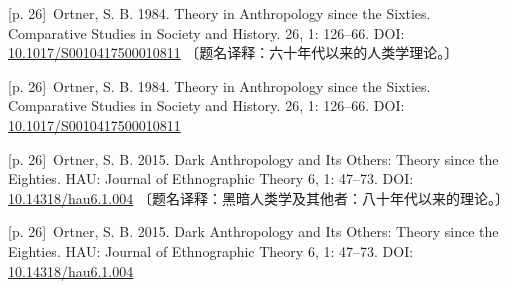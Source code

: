 \documentclass[10pt,a4paper]{article}
\begin{document}
\noindent\begin{minipage}{\textwidth}\begin{minipage}[t]{\dimexpr.5\textwidth-4mm\relax}\noindent\begin{minipage}[t]{\linewidth}{\scriptsize\color{gray} [p. 26]}\ Ortner, S. B. 1984. Theory in Anthropology since the Sixties. Comparative Studies in Society and History. 26, 1: 126–66. DOI: \url{10.1017/S0010417500010811} 〔题名译释：六十年代以来的人类学理论。〕\par\end{minipage}\par\end{minipage}\hfill\begin{minipage}[t]{\dimexpr.5\textwidth-4mm\relax}\noindent\begin{minipage}[t]{\linewidth}{\scriptsize\color{gray} [p. 26]}\ Ortner, S. B. 1984. Theory in Anthropology since the Sixties. Comparative Studies in Society and History. 26, 1: 126–66. DOI: \url{10.1017/S0010417500010811}\par\end{minipage}\par\end{minipage}\end{minipage}\par
\noindent\begin{minipage}{\textwidth}\begin{minipage}[t]{\dimexpr.5\textwidth-4mm\relax}\noindent\begin{minipage}[t]{\linewidth}{\scriptsize\color{gray} [p. 26]}\ Ortner, S. B. 2015. Dark Anthropology and Its Others: Theory since the Eighties. HAU: Journal of Ethnographic Theory 6, 1: 47–73. DOI: \url{10.14318/hau6.1.004} 〔题名译释：黑暗人类学及其他者：八十年代以来的理论。〕\par\end{minipage}\par\end{minipage}\hfill\begin{minipage}[t]{\dimexpr.5\textwidth-4mm\relax}\noindent\begin{minipage}[t]{\linewidth}{\scriptsize\color{gray} [p. 26]}\ Ortner, S. B. 2015. Dark Anthropology and Its Others: Theory since the Eighties. HAU: Journal of Ethnographic Theory 6, 1: 47–73. DOI: \url{10.14318/hau6.1.004}\par\end{minipage}\par\end{minipage}\end{minipage}\par
\end{document}
